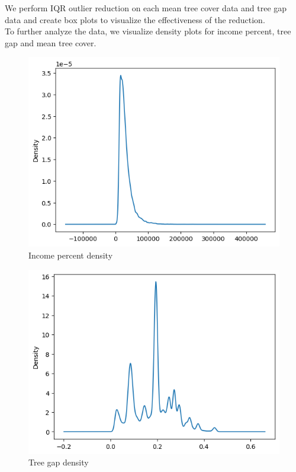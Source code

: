 \documentclass{article}
\begin{document}
We perform IQR outlier reduction on each mean tree cover data and tree gap data and create box plots to visualize the effectiveness of the reduction. 
 \\

To further analyze the data, we visualize density plots for income percent, tree gap and mean tree cover.


\begin{figure}[H]
    \centering
    \includegraphics[scale = 0.4]{income_percent_density.png}
    \caption{Income percent density}
    \label{fig:my_label}
\end{figure}

\begin{figure}[H]
    \centering
    \includegraphics[scale = 0.4]{tree_gap_density.png}
    \caption{Tree gap density}
    \label{fig:my_label}
\end{figure}
\end{document}
